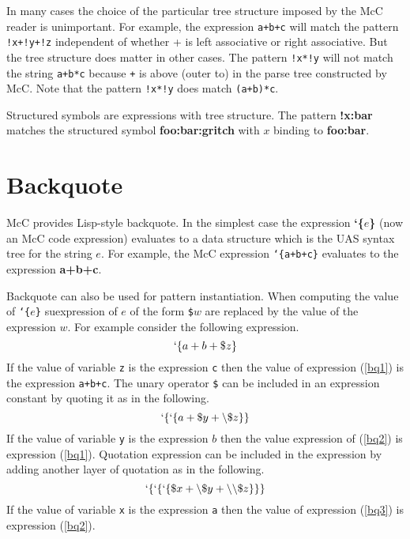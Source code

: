 \documentclass{article}
\newcommand{\mtt}[1]{\mbox{\tt #1}}
\begin{document}
In many cases the choice of the particular tree structure imposed by the McC reader is unimportant.  For example, the expression \mtt{a+b+c} will match the pattern
\mtt{!x+!y+!z} independent of whether + is left associative or right associative.  But the tree structure does matter in other cases.  The pattern \mtt{!x*!y}
will not match the string \mtt{a+b*c} because \mtt{+} is above (outer to) \mtt{*} in the parse tree constructed by McC. Note that the pattern \mtt{!x*!y} does match \mtt{(a+b)*c}.

Structured symbols are expressions with tree structure.  The pattern {\bf !x:bar} matches the structured symbol {\bf foo:bar:gritch} with {\bf $x$} binding to {\bf foo:bar}.

\section{Backquote}

McC provides Lisp-style backquote.
In the simplest case the expression {\bf `\{$e$\}} (now an McC code expression) evaluates to a data structure which is the UAS syntax tree for
the string $e$.  For example, the McC expression \mtt{`\{a+b+c\}}
evaluates to the expression {\bf a+b+c}.

Backquote can also be used for pattern instantiation.
When computing the value of \mtt{`\{$e$\}} suexpression of $e$ of the form \mtt{\$$w$} are replaced by the value of the expression $w$.
For example consider the following expression.
\begin{equation}
\label{bq1}
`\{a+b+\$z\}
\end{equation}
If the value of variable \mtt{z} is the expression \mtt{c} then the value of expression (\ref{bq1}) is the expression \mtt{a+b+c}.
The unary operator \mtt{\$} can be included in an expression constant by quoting it as in the following.
\begin{equation}
\label{bq2}
`\{`\{a + \$y + \backslash\$z\}\}
\end{equation}
If the value of variable \mtt{y} is the expression $b$ then the value expression of (\ref{bq2}) is expression (\ref{bq1}).
Quotation expression can be included in the expression by adding another layer of quotation as in the following.
\begin{equation}
\label{bq3}
`\{`\{`\{\$x + \backslash\$y + \backslash\backslash\$z\}\}\}
\end{equation}
If the value of variable \mtt{x} is the expression \mtt{a} then the value of expression (\ref{bq3}) is expression (\ref{bq2}).
\end{document}
